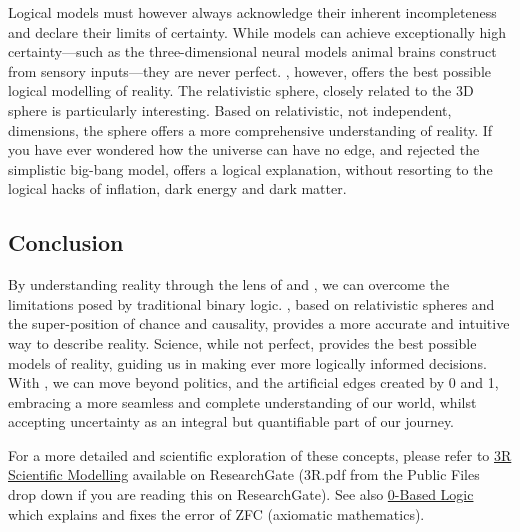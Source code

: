 \documentclass{article}
\begin{document}
Logical models must however always acknowledge their inherent incompleteness and declare their limits of certainty. While models can achieve exceptionally high certainty—such as the three-dimensional neural models animal brains construct from sensory inputs—they are never perfect. \iR{}, however, offers the best possible logical modelling of reality. The relativistic \iR{} sphere, closely related to the 3D sphere is particularly interesting. Based on relativistic, not independent, dimensions, the \iR{} sphere offers a more comprehensive understanding of reality. If you have ever wondered how the universe can have no edge, and rejected the simplistic big-bang model, \iR{} offers a logical explanation, without resorting to the logical hacks of inflation, dark energy and dark matter.

\subsection*{Conclusion}

By understanding reality through the lens of \iR{} and \qbit{}, we can overcome the limitations posed by traditional binary logic. \iR{}, based on relativistic spheres and the super-position of chance and causality, provides a more accurate and intuitive way to describe reality. Science, while not perfect, provides the best possible models of reality, guiding us in making ever more logically informed decisions. With \iR{}, we can move beyond politics, and the artificial edges created by 0 and 1, embracing a more seamless and complete understanding of our world, whilst accepting uncertainty as an integral but quantifiable part of our journey.

For a more detailed and scientific exploration of these concepts, please refer to \href{https://www.researchgate.net/publication/379035220_3R_Scientific_Modelling}{3R Scientific Modelling} available on ResearchGate (3R.pdf from the Public Files drop down if you are reading this on ResearchGate). See also \href{https://www.researchgate.net/publication/375632465_0-Based_Logic}{0-Based Logic} which explains and fixes the error of ZFC (axiomatic mathematics).
\end{document}

